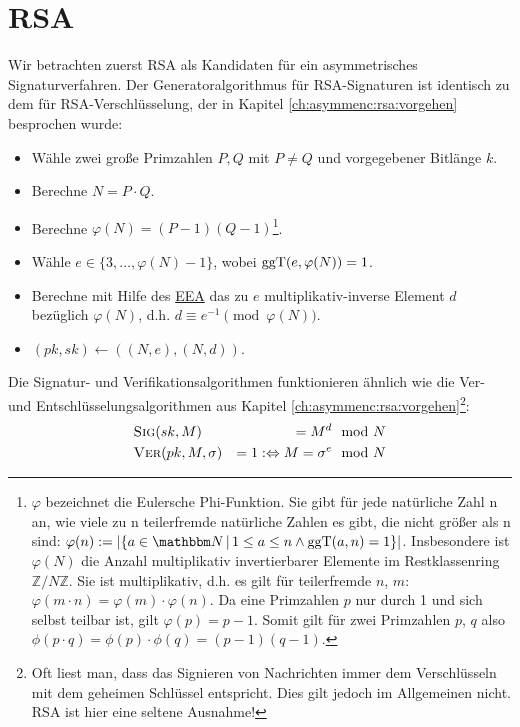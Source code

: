 \section{RSA}
Wir betrachten zuerst RSA als Kandidaten für ein asymmetrisches
Signaturverfahren. Der Generatoralgorithmus für RSA-Signaturen ist
identisch zu dem für RSA-Verschlüsselung, der in Kapitel
\ref{ch:asymmenc:rsa:vorgehen} besprochen wurde:
\begin{itemize}
 	\item Wähle zwei große Primzahlen $P, Q$ mit $P \neq Q$ und vorgegebener Bitlänge $k$.
 	\item Berechne $N = P \cdot Q$.
 	\item Berechne $\varphi(N) = (P - 1)(Q - 1)$\footnote{$\varphi$
            bezeichnet die Eulersche Phi-Funktion. Sie gibt für jede
            natürliche Zahl n an, wie viele zu n teilerfremde natürliche
            Zahlen es gibt, die nicht größer als n sind: 
            $\varphi(n) := \vert \{a\in\N \, |\, 1 \le a \le n
            \land \operatorname{ggT}(a,n) = 1 \} \vert$. Insbesondere
            ist $\varphi(N)$ die Anzahl multiplikativ invertierbarer
            Elemente im Restklassenring $\mathbb{Z}/N\mathbb{Z}$.
            Sie ist multiplikativ, d.h. es gilt für teilerfremde $n$, $m$:
            $\varphi(m\cdot n) = \varphi(m) \cdot \varphi(n)$. Da eine
            Primzahlen $p$ nur durch 1 und sich selbst teilbar ist, 
            gilt $\varphi(p) = p-1$. Somit gilt für zwei Primzahlen $p$,
            $q$ also $\phi(p \cdot q) = \phi(p) \cdot \phi(q) = (p-1)(q-1)$.}.
 	\item Wähle $e \in \{3, \dotsc, \varphi(N) - 1\}$, wobei
          $\operatorname{ggT}(e, \varphi(N)) = 1$. 
 	\item Berechne mit Hilfe des \hyperref[ssec:eea]{EEA} das zu $e$
          multiplikativ-inverse Element $d$ bezüglich $\varphi(N)$,
          d.h. $d \equiv e^{-1} \pmod{\varphi(N)}$.
        \item $(pk, sk)\leftarrow ((N,e), (N,d))$.
\end{itemize}
Die Signatur- und Verifikationsalgorithmen funktionieren ähnlich wie die
Ver- und Entschlüsselungsalgorithmen aus Kapitel \ref{ch:asymmenc:rsa:vorgehen}\footnote{Oft liest man, dass das Signieren
  von Nachrichten immer dem Verschlüsseln mit dem geheimen Schlüssel
  entspricht. Dies gilt jedoch im Allgemeinen nicht. RSA ist hier eine
  seltene Ausnahme!}:
\begin{alignat*}{3}
& \textsc{Sig}(sk, M) & = M^d & \mod N\\
& \textsc{Ver}(pk, M, \sigma) & = 1 : \Leftrightarrow M = \sigma^e & \mod N 
\end{alignat*}

